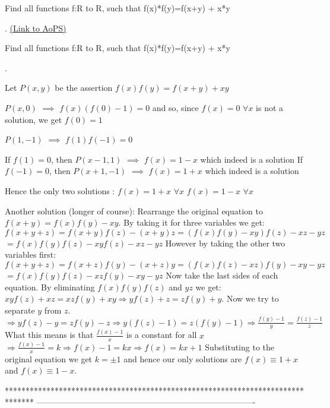 \begin{problem}
	Find all functions f:R to R, such that  f(x)*f(y)=f(x+y) + x*y

.
	\flushright \href{https://artofproblemsolving.com/community/c6h459613}{(Link to AoPS)}
\end{problem}



\begin{solution}
	\begin{tcolorbox}Find all functions f:R to R, such that  f(x)*f(y)=f(x+y) + x*y

.\end{tcolorbox}
Let $P(x,y)$ be the assertion $f(x)f(y)=f(x+y)+xy$

$P(x,0)$ $\implies$ $f(x)(f(0)-1)=0$ and so, since $f(x)=0$ $\forall x$ is not a solution, we get $f(0)=1$

$P(1,-1)$ $\implies$ $f(1)f(-1)=0$

If $f(1)=0$, then $P(x-1,1)$ $\implies$ $f(x)=1-x$ which indeed is a solution
If $f(-1)=0$, then $P(x+1,-1)$ $\implies$ $f(x)=1+x$ which indeed is a solution

Hence the only two solutions :
$f(x)=1+x$ $\forall x$
$f(x)=1-x$ $\forall x$
\end{solution}



\begin{solution}
	Another solution (longer of course):
Rearrange the original equation to $f(x+y)=f(x)f(y)-xy$. By taking it for three variables we get:
$f(x+y+z)=f(x+y)f(z)-(x+y)z=(f(x)f(y)-xy)f(z)-xz-yz$
$=f(x)f(y)f(z)-xyf(z)-xz-yz$
However by taking the other two variables first:
$f(x+y+z)=f(x+z)f(y)-(x+z)y=(f(x)f(z)-xz)f(y)-xy-yz$
$=f(x)f(y)f(z)-xzf(y)-xy-yz$
Now take the last sides of each equation. By eliminating $f(x)f(y)f(z)$ and $yz$ we get: $xyf(z)+xz=xzf(y)+xy \Rightarrow yf(z)+z=zf(y)+y$.
Now we try to separate $y$ from $z$.
$\Rightarrow yf(z)-y=zf(y)-z \Rightarrow y(f(z)-1)=z(f(y)-1) \Rightarrow \frac{f(y)-1}{y}=\frac{f(z)-1}{z}$
What this means is that $\frac{f(x)-1}{x}$ is a constant for all $x$ $\Rightarrow \frac{f(x)-1}{x}=k \Rightarrow f(x)-1=kx \Rightarrow f(x)=kx+1$
Substituting to the original equation we get $k=\pm 1$ and hence our only solutions are $f(x)\equiv 1+x$ and $f(x) \equiv 1-x$.
\end{solution}
*******************************************************************************
-------------------------------------------------------------------------------

